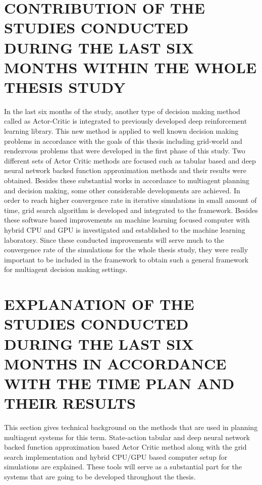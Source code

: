 \documentclass{ituphdreport}
\begin{document}
\section{CONTRIBUTION OF THE STUDIES CONDUCTED DURING THE LAST SIX  MONTHS WITHIN THE WHOLE THESIS STUDY}
In the last six months of the study, another type of decision making method called as Actor-Critic is integrated to previously developed deep reinforcement learning library. This new method is applied to well known decision making problems in accordance with the goals of this thesis including grid-world and rendezvous problems that were developed in the first phase of this study. Two different sets of Actor Critic methods are focused such as tabular based and deep neural network backed function approximation methods and their results were obtained. Besides these substantial works in accordance to multiagent planning and decision making, some other considerable developments are achieved. In order to reach higher convergence rate in iterative simulations in small amount of time, grid search algorithm is developed and integrated to the framework. Besides these software based improvements an machine learning focused computer with hybrid CPU and GPU is investigated and established to the machine learning laboratory. Since these conducted improvements will serve much to the convergence rate of the simulations for the whole thesis study, they were really important to be included in the framework to obtain such a general framework for multiagent decision making settings. 

\section{EXPLANATION OF THE STUDIES CONDUCTED DURING THE LAST SIX  MONTHS IN ACCORDANCE WITH THE TIME PLAN AND THEIR RESULTS} \label{sec:conductedstudies}
This section gives technical background on the methods that are used in planning multiagent systems for this term. State-action tabular and deep neural network backed function approximation based Actor Critic method along with the grid search implementation and hybrid CPU/GPU based computer setup for simulations are explained. These tools will serve as a substantial part for the systems that are going to be developed throughout the thesis.
\end{document}

